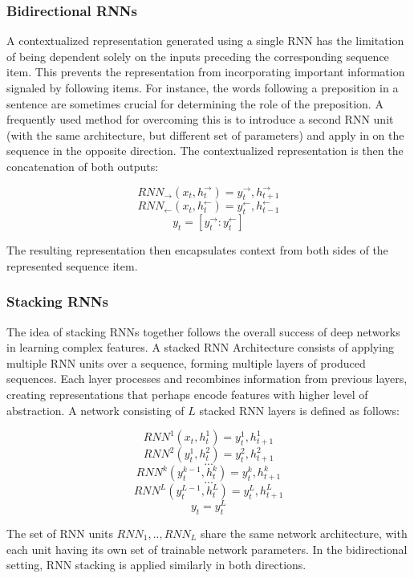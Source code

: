 \subsubsection{Bidirectional RNNs}

A contextualized representation generated using a single RNN has the limitation of being dependent solely on the inputs preceding the corresponding sequence item. This prevents the representation from incorporating important information signaled by following items. For instance, the words following a preposition in a sentence are sometimes crucial for determining the role of the preposition. A frequently used method for overcoming this is to introduce a second RNN unit (with the same architecture, but different set of parameters) and apply in on the sequence in the opposite direction. The contextualized representation is then the concatenation of both outputs:

$$ RNN_{\rightarrow}(x_t, h^{\rightarrow}_{t}) = y^{\rightarrow}_t,h^{\rightarrow}_{t + 1} $$
$$ RNN_{\leftarrow}(x_t, h^{\leftarrow}_{t}) = y^{\leftarrow}_t,h^{\leftarrow}_{t - 1} $$
$$ y_t = [y^{\rightarrow}_t:y^{\leftarrow}_t] $$

The resulting representation then encapsulates context from both sides of the represented sequence item.

\subsubsection{Stacking RNNs}

The idea of stacking RNNs together follows the overall success of deep networks in learning complex features. A stacked RNN Architecture consists of applying multiple RNN units over a sequence, forming multiple layers of produced sequences. Each layer processes and recombines information from previous layers, creating representations that perhaps encode features with higher level of abstraction. A network consisting of $L$ stacked RNN layers is defined as follows:

$$ RNN^1(x_t, h^1_t) = y^1_t, h^1_{t+1} $$
$$ RNN^2(y^1_t, h^2_t) = y^2_t, h^2_{t+1} $$
$$ ... $$
$$ RNN^k(y^{k-1}_t, h^k_t) = y^k_t, h^k_{t+1} $$
$$ ... $$
$$ RNN^L(y^{L-1}_t, h^L_t) = y^L_t, h^L_{t+1} $$
$$ y_t = y^L_t $$

The set of RNN units $RNN_1,..,RNN_L$ share the same network architecture, with each unit having its own set of trainable network parameters. In the bidirectional setting, RNN stacking is applied similarly in both directions.

